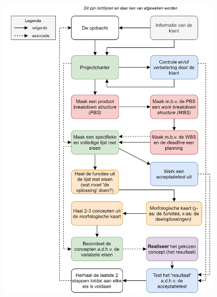 \documentclass[24pt,a4paper]{article}
\begin{document}
\begin{figure}[tph]
      \centering
      \includegraphics[height=\textheight]{graphics/OntwerpMethodiekMechatronica.png}
\end{figure}
\end{document}
